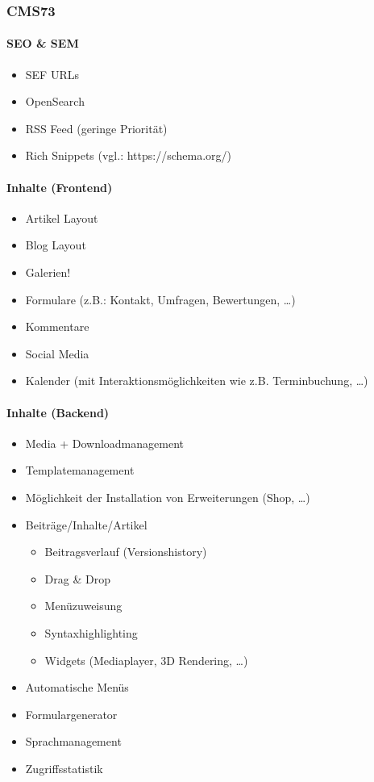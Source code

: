 
\subsubsection{CMS73}
	\paragraph{SEO \& SEM}
		\begin{itemize}
			\item SEF URLs
			\item OpenSearch
			\item RSS Feed (geringe Priorität)
			\item Rich Snippets (vgl.: https://schema.org/)
		\end{itemize}
	
	\paragraph{Inhalte (Frontend)}
		\begin{itemize}
			\item Artikel Layout
			\item Blog Layout
			\item Galerien!
			\item Formulare (z.B.: Kontakt, Umfragen, Bewertungen, …)
			\item Kommentare
			\item Social Media
			\item Kalender (mit Interaktionsmöglichkeiten wie z.B. Terminbuchung, …)
		\end{itemize}
		
	\paragraph{Inhalte (Backend)}
		\begin{itemize}
			\item Media + Downloadmanagement
			\item Templatemanagement
			\item Möglichkeit der Installation von Erweiterungen (Shop, …)
			\item Beiträge/Inhalte/Artikel
			\begin{itemize}
				\item Beitragsverlauf (Versionshistory)
				\item Drag \& Drop
				\item Menüzuweisung
				\item Syntaxhighlighting
				\item Widgets (Mediaplayer, 3D Rendering, …)
			\end{itemize}
			\item Automatische Menüs
			\item Formulargenerator
			\item Sprachmanagement
			\item Zugriffsstatistik
		\end{itemize}